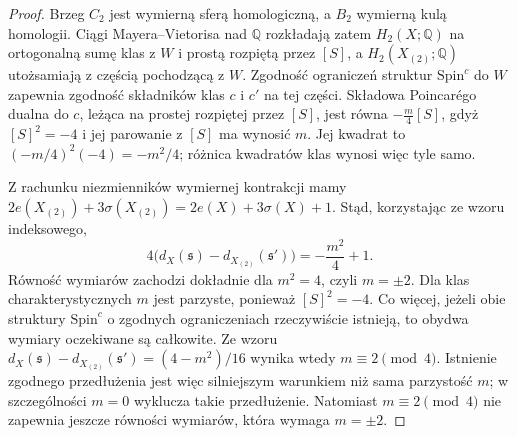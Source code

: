 \begin{proof}
Brzeg $C_2$ jest wymierną sferą homologiczną, a
$B_2$ wymierną kulą homologii. Ciągi
Mayera--Vietorisa nad $\mathbb Q$ rozkładają zatem
$H_2(X;\mathbb Q)$ na ortogonalną sumę klas z $W$
i prostą rozpiętą przez $[S]$, a
$H_2(X_{(2)};\mathbb Q)$ utożsamiają z częścią
pochodzącą z $W$. Zgodność ograniczeń struktur
$\mathrm{Spin}^c$ do $W$ zapewnia zgodność
składników klas $c$ i $c'$ na tej części.
Składowa Poincarégo dualna do $c$, leżąca na
prostej rozpiętej przez $[S]$, jest równa
$-\frac m4[S]$, gdyż $[S]^2=-4$ i jej
parowanie z $[S]$ ma wynosić $m$.
Jej kwadrat to $(-m/4)^2(-4)=-m^2/4$;
różnica kwadratów klas wynosi więc tyle samo.

Z rachunku niezmienników wymiernej kontrakcji mamy
$2e(X_{(2)})+3\sigma(X_{(2)})
=2e(X)+3\sigma(X)+1$.
Stąd, korzystając ze wzoru indeksowego,
\[
4\bigl(d_X(\mathfrak s)-d_{X_{(2)}}(\mathfrak s')\bigr)
=-\frac{m^2}{4}+1.
\]
Równość wymiarów zachodzi dokładnie dla $m^2=4$,
czyli $m=\pm2$. Dla klas charakterystycznych
$m$ jest parzyste, ponieważ $[S]^2=-4$.
Co więcej, jeżeli obie struktury $\mathrm{Spin}^c$
o zgodnych ograniczeniach rzeczywiście istnieją,
to obydwa wymiary oczekiwane są całkowite.
Ze wzoru
$d_X(\mathfrak s)-d_{X_{(2)}}(\mathfrak s')
=(4-m^2)/16$
wynika wtedy $m\equiv2\pmod4$.
Istnienie zgodnego przedłużenia jest więc
silniejszym warunkiem niż sama parzystość $m$;
w szczególności $m=0$ wyklucza takie przedłużenie.
Natomiast $m\equiv2\pmod4$ nie zapewnia jeszcze
równości wymiarów, która wymaga $m=\pm2$.
\end{proof}

